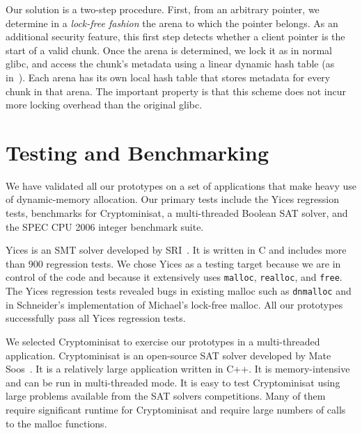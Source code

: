 \documentclass[twoside,12pt]{cslreport}
\begin{document}
Our solution is a two-step procedure. First, from an arbitrary
pointer, we determine in a \emph{lock-free fashion\/} the arena to
which the pointer belongs. As an additional security feature, this
first step detects whether a client pointer is the start of a valid
chunk.  Once the arena is determined, we lock it as in normal glibc,
and access the chunk's metadata using a linear dynamic hash table (as
in~\cite{Larson:1988:DHT}).  Each arena has its own local hash table
that stores metadata for every chunk in that arena. The important
property is that this scheme does not incur more locking overhead than
the original glibc.





\section{Testing and Benchmarking}

We have validated all our prototypes on a set of applications that
make heavy use of dynamic-memory allocation. Our primary tests include
the Yices regression tests, benchmarks for Cryptominisat, a
multi-threaded Boolean SAT solver, and the SPEC CPU 2006 integer
benchmark suite.  

Yices is an SMT solver developed by
SRI~\cite{Dutertre:cav2014}. It is written in C and includes
more than 900 regression tests. We chose Yices as a testing target
because we are in control of the code and because it extensively uses
\texttt{malloc}, \texttt{realloc}, and \texttt{free}. The Yices
regression tests revealed bugs in existing malloc such as
\texttt{dnmalloc} and in Schneider's implementation of Michael's
lock-free malloc. All our prototypes successfully pass all Yices
regression tests.

We selected Cryptominisat to exercise our prototypes in a
multi-threaded application. Cryptominisat is an open-source SAT solver
developed by Mate Soos~\cite{cryptominisat}. It is a relatively large
application written in C++. It is memory-intensive and can be run in
multi-threaded mode. It is easy to test Cryptominisat using large
problems available from the SAT solvers competitions. Many of them
require significant runtime for Cryptominisat and require large
numbers of calls to the malloc functions.
\end{document}
